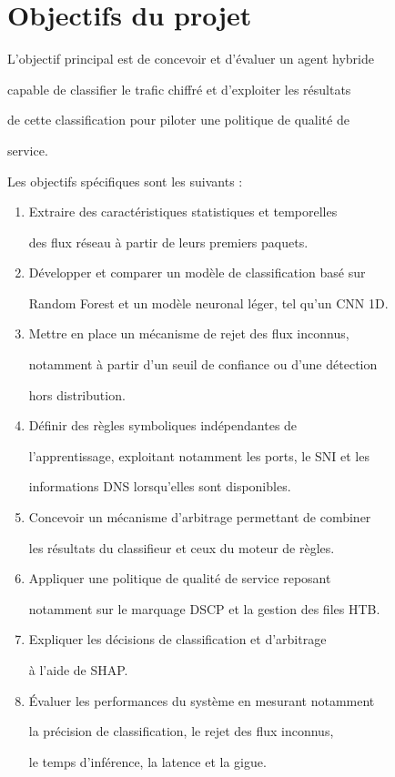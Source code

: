 \section{Objectifs du projet}



L'objectif principal est de concevoir et d'évaluer un agent hybride

capable de classifier le trafic chiffré et d'exploiter les résultats

de cette classification pour piloter une politique de qualité de

service.



Les objectifs spécifiques sont les suivants :



\begin{enumerate}

    \item Extraire des caractéristiques statistiques et temporelles

    des flux réseau à partir de leurs premiers paquets.

    \item Développer et comparer un modèle de classification basé sur

    Random Forest et un modèle neuronal léger, tel qu'un CNN 1D.

    \item Mettre en place un mécanisme de rejet des flux inconnus,

    notamment à partir d'un seuil de confiance ou d'une détection

    hors distribution.

    \item Définir des règles symboliques indépendantes de

    l'apprentissage, exploitant notamment les ports, le SNI et les

    informations DNS lorsqu'elles sont disponibles.

    \item Concevoir un mécanisme d'arbitrage permettant de combiner

    les résultats du classifieur et ceux du moteur de règles.

    \item Appliquer une politique de qualité de service reposant

    notamment sur le marquage DSCP et la gestion des files HTB.

    \item Expliquer les décisions de classification et d'arbitrage

    à l'aide de SHAP.

    \item Évaluer les performances du système en mesurant notamment

    la précision de classification, le rejet des flux inconnus,

    le temps d'inférence, la latence et la gigue.

\end{enumerate}



